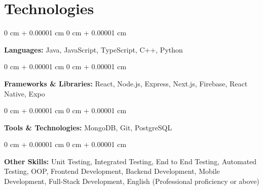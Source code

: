 \documentclass[10pt, letterpaper]{article}
\newenvironment{onecolentry}{
    \begin{adjustwidth}{
        0 cm + 0.00001 cm
    }{
        0 cm + 0.00001 cm
    }
}{
    \end{adjustwidth}
} %
\begin{document}
\section{Technologies}

\begin{onecolentry}
    \textbf{Languages:} Java, JavaScript, TypeScript, C++, Python
\end{onecolentry}
\vspace{0.2 cm}
\begin{onecolentry}
    \textbf{Frameworks \& Libraries:} React, Node.js, Express, Next.js, Firebase, React Native, Expo
\end{onecolentry}
\vspace{0.2 cm}
\begin{onecolentry}
    \textbf{Tools \& Technologies:} MongoDB, Git, PostgreSQL
\end{onecolentry}
\vspace{0.2 cm}
\begin{onecolentry}
    \textbf{Other Skills:} Unit Testing, Integrated Testing, End to End Testing, Automated Testing, OOP, Frontend Development, Backend Development, Mobile Development, Full-Stack Development, English (Professional proficiency or above)
\end{onecolentry}
\end{document}
